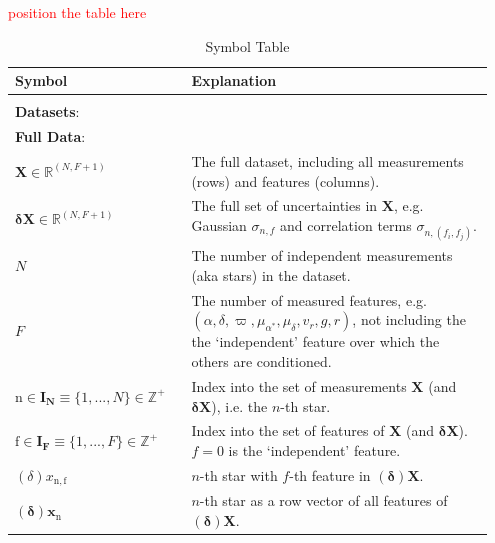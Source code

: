 \documentclass[twocolumn]{aastex631}
\newcommand{\mrm}[1]{\mathrm{#1}}
\newcommand{\mbs}[1]{\boldsymbol{#1}}
\newcommand{\mbf}[1]{\mathbf{#1}}
\newcommand{\mbb}[1]{\mathbb{#1}}
\newcommand{\nth}[1]{{#1}_{\mrm{n}}}  %
\newcommand{\parallax}{\varpi}
\newcommand{\TODO}[1]{{\textcolor{red}{#1}}}
\begin{document}
    \TODO{position the table here}

    \begin{table}
    \centering
    \caption{Symbol Table}
    \label{table:symbol_table}
    \begin{tabular}{p{0.35\linewidth} p{0.6\linewidth}}
    Symbol                         & Explanation \\
    \toprule
    \\
    \multicolumn{2}{l}{\textbf{Datasets}:} \\
    \midrule
    \multicolumn{2}{l}{\textbf{Full Data}:}  \vspace{5pt} \\
    $\mbf{X} \in \mbb{R}^{(N, F+1)}$ & The full dataset, including all measurements (rows) and features (columns).  \\
    $\mbs{\delta}\mbf{X} \in \mbb{R}^{(N, F+1)}$ & The full set of uncertainties in $\mbf{X}$, e.g. Gaussian $\sigma_{n,f}$ and correlation terms $\sigma_{n,(f_i, f_j)}$.\\
    $N$ & The number of independent measurements (aka stars) in the dataset.  \\
    $F$ & The number of measured features, e.g. $(\alpha, \delta, \parallax, \mu_{\alpha^*}, \mu_\delta, v_r, g, r)$,  not including the the `independent' feature over which the others are conditioned. \\
    $\mrm{n} \in \mbs{I_N} \equiv \{1, ..., N\} \in \mbb{Z^+}$ & Index into the set of measurements $\mbf{X}$ (and $\mbs{\delta}\mbf{X}$), i.e. the $n$-th star. \\
    $\mrm{f} \in \mbs{I_F}  \equiv \{1, ..., F\} \in \mbb{Z^+}$ & Index into the set of features of $\mbf{X}$  (and $\mbs{\delta}\mbf{X}$). $ f=0$ is the `independent' feature.\\
    $(\delta)x_{\mrm{n,f}}$ & $n$-th star with $f$-th feature in $(\mbs{\delta})\mbf{X}$. \\
    $(\mbs{\delta})\nth{\mbs{x}}$ & $n$-th star as a row vector of all features of $(\mbs{\delta})\mbf{X}$. \\
    

\end{tabular}
\end{table}
\end{document}
